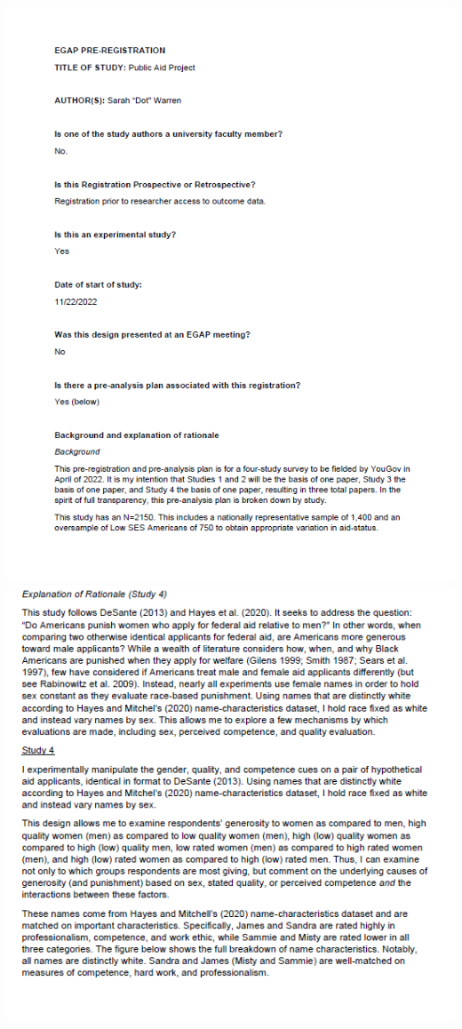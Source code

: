 \documentclass[12pt]{article}%
\begin{document}
\begin{doublespace}
\includegraphics[scale=1.5]{figs/pap1.png} \\
\includegraphics[scale=1.5]{figs/pap2.png} \\

\end{doublespace}
\end{document}
